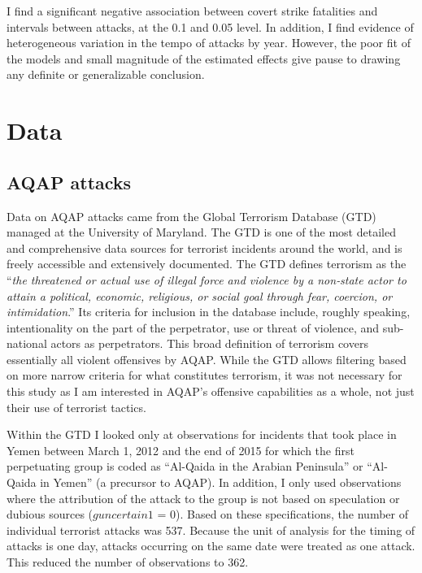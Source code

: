 \documentclass[letterpaper,12pt]{article}
\theoremstyle{definition}
\begin{document}
I find a significant negative association between covert strike fatalities and intervals between attacks, at the 0.1 and 0.05 level. In addition, I find evidence of heterogeneous variation in the tempo of attacks by year. However, the poor fit of the models and small magnitude of the estimated effects give pause to drawing any definite or generalizable conclusion.

\section{Data}

\subsection{AQAP attacks}

Data on AQAP attacks came from the Global Terrorism Database (GTD) managed at the University of Maryland. The GTD is one of the most detailed and comprehensive data sources for terrorist incidents around the world, and is freely accessible and extensively documented. The GTD defines terrorism as the ``\textit{the threatened or actual use of illegal force and violence by a non‐state actor to attain a political, economic, religious, or social goal through fear, coercion,
or intimidation}.'' Its criteria for inclusion in the database include, roughly speaking, intentionality on the part of the perpetrator, use or threat of violence, and sub-national actors as perpetrators. This broad definition of terrorism covers essentially all violent offensives by AQAP. While the GTD allows filtering based on more narrow criteria for what constitutes terrorism, it was not necessary for this study as I am interested in AQAP's offensive capabilities as a whole, not just their use of terrorist tactics.

Within the GTD I looked only at observations for incidents that took place in Yemen between March 1, 2012 and the end of 2015 for which the first perpetuating group is coded as ``Al-Qaida in the Arabian Peninsula'' or ``Al-Qaida in Yemen'' (a precursor to AQAP). In addition, I only used observations where the attribution of the attack to the group is not based on speculation or dubious sources ($guncertain1$ = 0). Based on these specifications, the number of individual terrorist attacks was 537. Because the unit of analysis for the timing of attacks is one day, attacks occurring on the same date were treated as one attack. This reduced the number of observations to 362.
\end{document}
